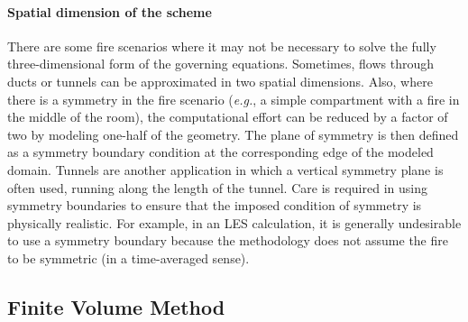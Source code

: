 \documentclass[graybox]{svmult}
\begin{document}
\paragraph{Spatial dimension of the scheme}

There are some fire scenarios where it may not be necessary to solve the fully three-dimensional form of the governing equations. Sometimes, flows through ducts or tunnels can be approximated in two spatial dimensions. Also, where there is a symmetry in the fire scenario ({\em e.g.}, a simple compartment with a fire in the middle of the room), the computational effort can be reduced by a factor of two by modeling one-half of the geometry. The plane of symmetry is then defined as a symmetry boundary condition at the corresponding edge of the modeled domain. Tunnels are another application in which a vertical symmetry plane is often used, running along the length of the tunnel. Care is required in using symmetry boundaries to ensure that the imposed condition of symmetry is physically realistic. For example, in an LES calculation, it is generally undesirable to use a symmetry boundary because the methodology does not assume the fire to be symmetric (in a time-averaged sense).



\subsection{Finite Volume Method}
\end{document}
